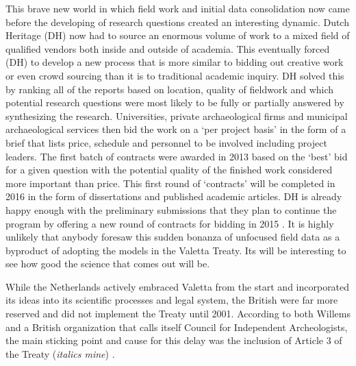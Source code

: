 \documentclass[english]{ijsra}
\begin{document}
This brave new world in which field work and initial data consolidation now came before the developing of research questions created an interesting dynamic. Dutch Heritage (DH) now had to source an enormous volume of work to a mixed field of qualified vendors both inside and outside of academia. This eventually forced (DH) to develop a new process that is more similar to bidding out creative work or even crowd sourcing than it is to traditional academic inquiry. DH solved this by ranking all of the reports based on location, quality of fieldwork and which potential research questions were most likely to be fully or partially answered by synthesizing the research. Universities, private archaeological firms and municipal archaeological services then bid the work on a ‘per project basis’ in the form of a brief that lists price, schedule and personnel to be involved including project leaders. 
The first batch of contracts were awarded in 2013 based on the ‘best’ bid for a given question with the potential quality of the finished work considered more important than price. This first round of ‘contracts’ will be completed in 2016 in the form of dissertations and published academic articles. DH is already happy enough with the preliminary submissions that they plan to continue the program by offering a new round of contracts for bidding in 2015 \parencite{Groenewoudt_2014}. 
It is highly unlikely that anybody foresaw this sudden bonanza of unfocused field data as a byproduct of adopting the models in the Valetta Treaty. Its will be interesting to see how good the science that comes out will be. 


While the Netherlands actively embraced Valetta from the start and incorporated its ideas into its scientific processes and legal system, the British were far more reserved and did not implement the Treaty until 2001. According to both Willems and a British organization that calls itself Council for Independent Archeologists, the main sticking point and cause for this delay was the inclusion of Article 3 of the Treaty (\textit{italics mine}) \parencites[62]{Willems_2007}{CIA_2001}. 
\end{document}
